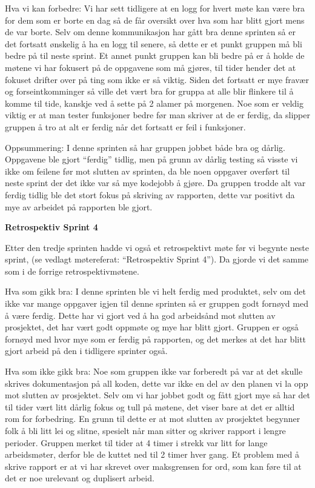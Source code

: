 \documentclass[12pt,a4paper,norsk]{article}
\begin{document}
Hva vi kan forbedre:
Vi har sett tidligere at en logg for hvert møte kan være bra for dem som er borte en dag så de får oversikt over hva som har blitt gjort mens de var borte. Selv om denne kommunikasjon har gått bra denne sprinten så er det fortsatt ønskelig å ha en logg til senere, så dette er et punkt gruppen må bli bedre på til neste sprint. 
Et annet punkt gruppen kan bli bedre på er å holde de møtene vi har fokusert på de oppgavene som må gjøres, til tider hender det at fokuset drifter over på ting som ikke er så viktig. Siden det fortsatt er mye fravær og forseintkomminger så ville det vært bra for gruppa at alle blir flinkere til å komme til tide, kanskje ved å sette på 2 alamer på morgenen.   
Noe som er veldig viktig er at man tester funksjoner bedre før man skriver at de er ferdig, da slipper gruppen å tro at alt er ferdig når det fortsatt er feil i funksjoner. 

Oppsummering:
I denne sprinten så har gruppen jobbet både bra og dårlig. Oppgavene ble gjort “ferdig” tidlig, men på grunn av dårlig testing så visste vi ikke om feilene før mot slutten av sprinten, da ble noen oppgaver overført til neste sprint der det ikke var så mye kodejobb å gjøre. Da gruppen trodde alt var ferdig tidlig ble det stort fokus på skriving av rapporten, dette var positivt da mye av arbeidet på rapporten ble gjort.

\bigskip \noindent \textbf{Retrospektiv Sprint 4}
\par Etter den tredje sprinten hadde vi også et retrospektivt møte før vi begynte neste sprint, (se vedlagt møtereferat: “Retrospektiv Sprint 4”). Da gjorde vi det samme som i de forrige retrospektivmøtene. 

Hva som gikk bra:
I denne sprinten ble vi helt ferdig med produktet, selv om det ikke var mange oppgaver igjen til denne sprinten så er gruppen godt fornøyd med å være ferdig. Dette har vi gjort ved å ha god arbeidsånd mot slutten av prosjektet, det har vært godt oppmøte og mye har blitt gjort. 
Gruppen er også fornøyd med hvor mye som er ferdig på rapporten, og det merkes at det har blitt gjort arbeid på den i tidligere sprinter også. 

Hva som ikke gikk bra:
Noe som gruppen ikke var forberedt på var at det skulle skrives dokumentasjon på all koden, dette var ikke en del av den planen vi la opp mot slutten av prosjektet. 
Selv om vi har jobbet godt og fått gjort mye så har det til tider vært litt dårlig fokus og tull på møtene, det viser bare at det er alltid rom for forbedring. En grunn til dette er at mot slutten av prosjektet begynner folk å bli litt lei og slitne, spesielt når man sitter og skriver rapport i lengre perioder. Gruppen merket til tider at 4 timer i strekk var litt for lange arbeidsmøter, derfor ble de kuttet ned til 2 timer hver gang.
Et problem med å skrive rapport er at vi har skrevet over maksgrensen for ord, som kan føre til at det er noe urelevant og duplisert arbeid. 
\end{document}

